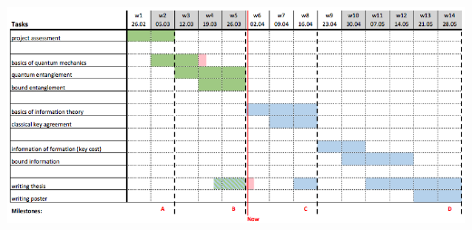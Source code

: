 \documentclass{article}
\begin{document}
\centerline{
	\includegraphics[scale=0.5]{gantt-4.png}
}
\pagebreak
%
%	
%	
%	
%	
%	
%	
%	
%
\end{document}
